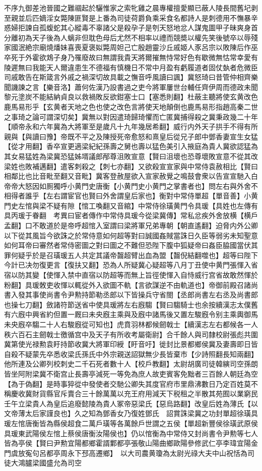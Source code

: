 不序九御差池晉國之難祻起於驪惟家之索牝雞之晨專權擅愛顯已蔽人陵長間舊圮剥至親並后匹嫡淫女斃陳匪賢是上番為司徒荷爵負乘采食名都詩人是刺德用不憮暴辛惑婦拒諫自孤蝮蛇其心縱毒不辜諸父是殺孕子是刳天怒地忿人謀鬼圖甲子昧爽身首分離初為天子後為人螭非但耽色母后尤然不相率以禮而競奬以權先笑後號卒以辱殘家國泯絶宗廟燒燔妹喜喪夏褒姒斃周妲己亡殷趙靈沙丘戚姬人豕呂宗以敗陳后作巫卒死于外霍欲鴆子身乃罹廢故曰無謂我貴天將爾摧無恃常好色有歇微無怙常幸愛有陵遲無曰我能天人爾違患生不德福有慎機日不常中月盈有虧履道者固仗埶者危微臣司戚敢告在斯箴言外戚之禍深切故具載之憮音呼風讀曰諷】冀怒琦曰昔管仲相齊樂聞譏諫之言【樂音洛】蕭何佐漢乃設書過之吏今將軍屢世台輔任齊伊周而德政未聞黎元塗炭不能結納貞良以救禍敗反欲鉗塞士口【塞悉則翻】杜蔽主聽將使玄黄改色鹿馬易形乎【玄黄者天地之色也使之改色言將使天地顛倒也鹿馬易形指趙高秦二世之事琦之論可謂深切矣】冀無以對因遣琦歸琦懼而亡匿冀捕得殺之冀秉政幾二十年【順帝永和六年冀為大將軍至是歲凡十九年幾居希翻】威行内外天子拱手不得有所親與【與讀曰豫】帝既不平之及陳授死帝愈怒和熹皇后從兄子郎中鄧香妻宣生女猛【從才用翻】香卒宣更適梁紀紀孫壽之舅也壽以猛色美引入掖庭為貴人冀欲認猛為其女易猛姓為梁冀恐猛姊壻議郎邴尊沮敗宣意【賢曰沮壞也恐尊壞敗宣意不從其改梁姓也敗補邁翻】遣客刺殺之【刺七亦翻】又欲殺宣宣家與中常侍袁赦相比【賢曰相鄰比也比音毗至翻又音毗】冀客登赦屋欲入宣家赦覺之鳴鼓會衆以告宣宣馳入白帝帝大怒因如厠獨呼小黄門史唐衡【小黄門史小黄門之掌書者也】問左右與外舍不相得者誰乎【左右謂宦官也賢曰外舍謂皇后家也】衡對中常侍單超【單音善】小黄門史左悺與梁不疑有隙【悺工喚翻又音綰】中常侍徐璜黄門令具瑗【具姓也左傳有具丙瑗于眷翻　考異曰宦者傳作中常侍具瑗今從梁冀傳】常私忿疾外舍放横【横戶孟翻】口不敢道於是帝呼超悺入室謂曰梁將軍兄弟專朝【朝直遙翻】迫脅内外公卿以下從其風旨今欲誅之於常侍意如何超等對曰誠國姦賊當誅日久臣等弱劣未知聖意如何耳帝曰審然者常侍密圖之對曰圖之不難但恐陛下腹中狐疑帝曰姦臣脇國當伏其罪何疑乎於是召璜瑗五人共定其議帝齧超臂出血為盟【齧倪結翻噬也】超等曰陛下今計已决勿復更言【復扶又翻】恐為人所疑冀心疑超等八月丁丑使中黄門張惲入省宿以防其變【使惲入禁中直宿以防超等而無上旨徑使惲入自恃威行宫省故敢然惲於粉翻】具瑗敇吏收惲以輒從外入欲圖不軌【言欲謀逆不由軌道也】帝御前殿召諸尚書入發其事使尚書令尹勲持節勒丞郎以下皆操兵守省閤【丞郎尚書左右丞及尚書郎也操七刀翻】斂諸符節送省中使具瑗將左右廐騶【賢曰騶騎士也余按續漢志太僕舊有六廐中興省約但置一厩曰未央廐主乘與及廐中諸馬後又置左駿廐令别主乘輿御馬未央廐卒騶二十人右駿廐從可知也】虎賁羽林都候劒戟士【續漢志左右都候各一人秩六百石主劒戟士徼循宫中及天子有所收考屬衛尉】合千餘人與司隸校尉張彪共圍冀第使光禄勲袁盱持節收冀大將軍印綬【盱音吁】徙封比景都鄉侯冀及妻壽即日皆自殺不疑蒙先卒悉收梁氏孫氏中外宗親送詔獄無少長皆棄市【少詩照翻長知兩翻】他所連及公卿列校刺史二千石死者數十人【校戶教翻】太尉胡廣司徒韓縯司空孫朗皆坐阿附梁冀不衛宫止長壽亭減死一等免為庶人故吏賓客免黜者三百餘人朝廷為空【為于偽翻】是時事猝從中發使者交馳公卿失其度官府市里鼎沸數日乃定百姓莫不稱慶收冀財貨縣官斥賣合三十餘萬萬以充王府用減天下税租之半散其苑囿以業窮民　壬午立梁貴人為皇后追廢懿陵為貴人冢帝惡梁氏【惡烏路翻】改皇后姓為薄氏【以文帝薄太后家謹良也】久之知為鄧香女乃復姓鄧氏　詔賞誅梁冀之功封單超徐璜具瑗左悺唐衡皆為縣侯超食二萬戶璜等各萬餘戶世謂之五侯【單超新豐侯徐璜武原侯具瑗東武陽侯左悺上蔡侯唐衡汝陽侯也】仍以悺衡為中常侍又封尚書令尹勲等七人皆為亭侯【賢曰尹勲宜陽都鄉霍諝鄴都亭張敬山陽曲鄉歐陽參修武仁亭李瑋宜陽金門虞放寃句呂都亭周永下邳高遷鄉】　以大司農黄瓊為太尉光祿大夫中山祝恬為司徒大鴻臚梁國盛允為司空